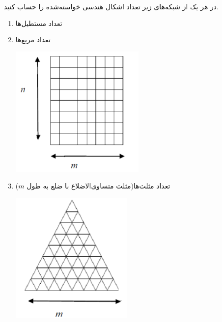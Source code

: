 \EXERCISE
در هر یک از شبکه‌های زیر تعداد اشکال هندسی خواسته‌شده را حساب کنید.
\begin{enumerate}
\item
تعداد مستطیل‌ها
\item
تعداد مربع‌ها
\begin{center}
\includegraphics[height=6.5cm]{27.png}
\end{center}
\item
تعداد مثلث‌ها(مثلث متساوی‌الاضلاع با ضلع به طول $m$)
\begin{center}
\includegraphics[height=6.5cm]{28.png}
\end{center}
\end{enumerate}
